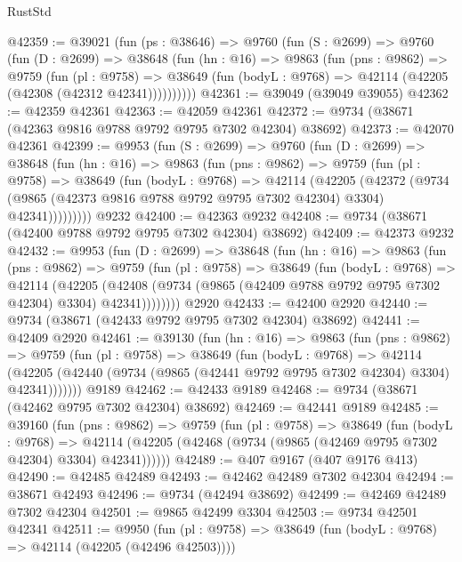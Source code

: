 \begin{lexlean}{RustStd}
\begin{coremodule}
@42359 := @39021
    (fun (ps : @38646) =>
    @9760
      (fun (S : @2699) =>
      @9760
        (fun (D : @2699) =>
        @38648
          (fun (hn : @16) =>
          @9863
            (fun (pns : @9862) =>
            @9759
              (fun (pl : @9758) =>
              @38649 (fun (bodyL : @9768) => @42114 (@42205 (@42308 (@42312 @42341))))))))))
@42361 := @39049 (@39049 @39055)
@42362 := @42359 @42361
@42363 := @42059 @42361
@42372 := @9734 (@38671 (@42363 @9816 @9788 @9792 @9795 @7302 @42304) @38692)
@42373 := @42070 @42361
@42399 := @9953
    (fun (S : @2699) =>
    @9760
      (fun (D : @2699) =>
      @38648
        (fun (hn : @16) =>
        @9863
          (fun (pns : @9862) =>
          @9759
            (fun (pl : @9758) =>
            @38649
              (fun (bodyL : @9768) =>
              @42114
                (@42205
                  (@42372
                    (@9734
                      (@9865 (@42373 @9816 @9788 @9792 @9795 @7302 @42304) @3304)
                      @42341)))))))))
    @9232
@42400 := @42363 @9232
@42408 := @9734 (@38671 (@42400 @9788 @9792 @9795 @7302 @42304) @38692)
@42409 := @42373 @9232
@42432 := @9953
    (fun (D : @2699) =>
    @38648
      (fun (hn : @16) =>
      @9863
        (fun (pns : @9862) =>
        @9759
          (fun (pl : @9758) =>
          @38649
            (fun (bodyL : @9768) =>
            @42114
              (@42205
                (@42408 (@9734 (@9865 (@42409 @9788 @9792 @9795 @7302 @42304) @3304) @42341))))))))
    @2920
@42433 := @42400 @2920
@42440 := @9734 (@38671 (@42433 @9792 @9795 @7302 @42304) @38692)
@42441 := @42409 @2920
@42461 := @39130
    (fun (hn : @16) =>
    @9863
      (fun (pns : @9862) =>
      @9759
        (fun (pl : @9758) =>
        @38649
          (fun (bodyL : @9768) =>
          @42114
            (@42205 (@42440 (@9734 (@9865 (@42441 @9792 @9795 @7302 @42304) @3304) @42341)))))))
    @9189
@42462 := @42433 @9189
@42468 := @9734 (@38671 (@42462 @9795 @7302 @42304) @38692)
@42469 := @42441 @9189
@42485 := @39160
    (fun (pns : @9862) =>
    @9759
      (fun (pl : @9758) =>
      @38649
        (fun (bodyL : @9768) =>
        @42114 (@42205 (@42468 (@9734 (@9865 (@42469 @9795 @7302 @42304) @3304) @42341))))))
@42489 := @407 @9167 (@407 @9176 @413)
@42490 := @42485 @42489
@42493 := @42462 @42489 @7302 @42304
@42494 := @38671 @42493
@42496 := @9734 (@42494 @38692)
@42499 := @42469 @42489 @7302 @42304
@42501 := @9865 @42499 @3304
@42503 := @9734 @42501 @42341
@42511 := @9950
    (fun (pl : @9758) => @38649 (fun (bodyL : @9768) => @42114 (@42205 (@42496 @42503))))

\end{coremodule}
\end{lexlean}
